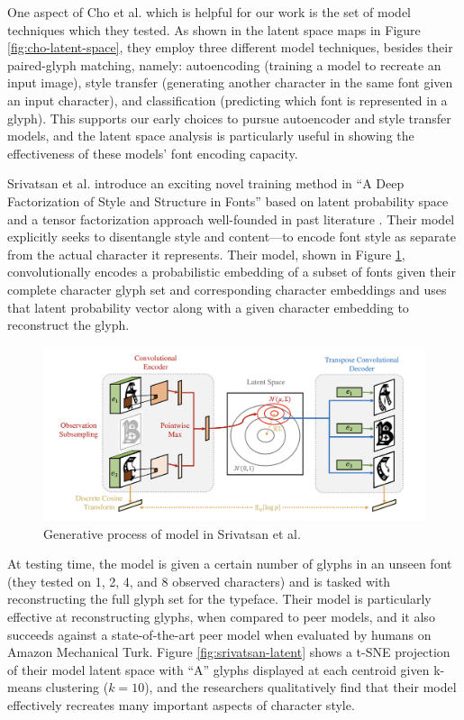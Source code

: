 One aspect of Cho et al. which is helpful for our work is the set of model techniques which they tested. As shown in the latent space maps in Figure \ref{fig:cho-latent-space}, they employ three different model techniques, besides their paired-glyph matching, namely: autoencoding (training a model to recreate an input image), style transfer (generating another character in the same font given an input character), and classification (predicting which font is represented in a glyph). This supports our early choices to pursue autoencoder and style transfer models, and the latent space analysis is particularly useful in showing the effectiveness of these models' font encoding capacity.

Srivatsan et al. introduce an exciting novel training method in ``A Deep Factorization of Style and Structure in Fonts'' based on latent probability space and a tensor factorization approach well-founded in past literature \cite{srivatsan2020}. Their model explicitly seeks to disentangle style and content—to encode font style as separate from the actual character it represents. Their model, shown in Figure \ref{fig:srivatsan-model}, convolutionally encodes a probabilistic embedding of a subset of fonts given their complete character glyph set and corresponding character embeddings and uses that latent probability vector along with a given character embedding to reconstruct the glyph.

\begin{figure}[h]
    \centering
    \includegraphics[width=.9\textwidth]{images/srivatsan-model.png}
    \caption{Generative process of model in Srivatsan et al.}
    \label{fig:srivatsan-model}
\end{figure}

At testing time, the model is given a certain number of glyphs in an unseen font (they tested on 1, 2, 4, and 8 observed characters) and is tasked with reconstructing the full glyph set for the typeface. Their model is particularly effective at reconstructing glyphs, when compared to peer models, and it also succeeds against a state-of-the-art peer model when evaluated by humans on Amazon Mechanical Turk. Figure \ref{fig:srivatsan-latent} shows a t-SNE projection of their model latent space with ``A'' glyphs displayed at each centroid given k-means clustering ($k=10$), and the researchers qualitatively find that their model effectively recreates many important aspects of character style.

